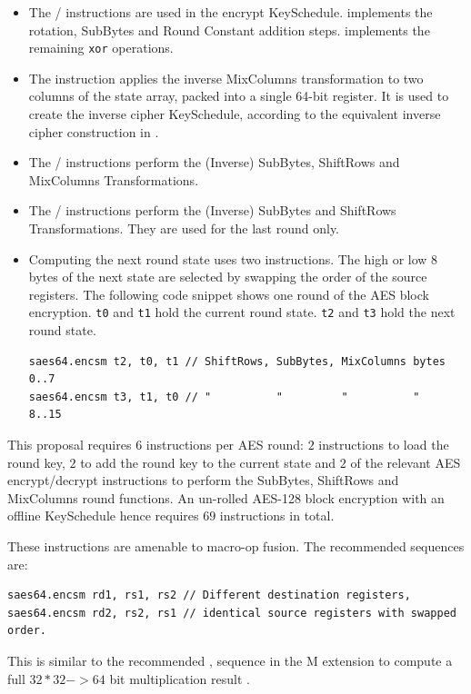 \begin{itemize}

\item
The
/
instructions are used in the encrypt KeySchedule.
 implements the rotation, SubBytes and Round Constant
addition steps.
 implements the remaining {\tt xor} operations.

\item
The
instruction applies the inverse MixColumns
transformation to two columns of the state array, packed into a single
64-bit register.
It is used to create the inverse cipher KeySchedule, according to
the equivalent inverse cipher construction in
\cite[Page 23, Section 5.3.5]{nist:fips:197}.

\item
The / instructions perform the
(Inverse) SubBytes, ShiftRows and MixColumns Transformations.

\item
The / instructions perform the
(Inverse) SubBytes and ShiftRows Transformations.
They are used for the last round only.

\item
Computing the next round state uses two instructions.
The high or low 8 bytes of the next state are selected by swapping the order
of the source registers.
The following code snippet shows one round of the AES block encryption.
{\tt t0} and {\tt t1} hold the current round state.
{\tt t2} and {\tt t3} hold the next round state.
\begin{lstlisting}
saes64.encsm t2, t0, t1 // ShiftRows, SubBytes, MixColumns bytes 0..7
saes64.encsm t3, t1, t0 // "          "         "          "     8..15
\end{lstlisting}
\end{itemize}

This proposal requires $6$ instructions per AES round:
$2$  instructions to load the round key,
$2$  to add the round key to the current state
and
$2$ of the relevant AES encrypt/decrypt instructions to perform the
    SubBytes, ShiftRows and MixColumns round functions.
An un-rolled AES-128 block encryption with an offline KeySchedule
hence requires $69$ instructions in total.

These instructions are amenable to macro-op fusion.
The recommended sequences are:
\begin{lstlisting}[language=pseudo]
saes64.encsm rd1, rs1, rs2 // Different destination registers,
saes64.encsm rd2, rs2, rs1 // identical source registers with swapped order.
\end{lstlisting}
This is similar to the recommended , 
sequence in the M extension to compute a full $32*32->64$ bit
multiplication result \cite[Section 7.1]{riscv:spec:user}.

